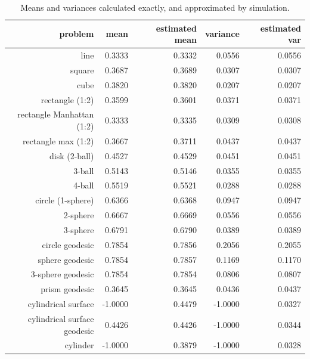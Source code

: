 \begin{table}[ht]
  \centering
  \begin{tabular}{r|rrrr}
                  problem &     mean & estimated mean & variance &  estimated var \\
     \hline 
                     line &   0.3333 &         0.3332 &   0.0556 &         0.0556 \\
                   square &   0.3687 &         0.3689 &   0.0307 &         0.0307 \\
                     cube &   0.3820 &         0.3820 &   0.0207 &         0.0207 \\
          rectangle (1:2) &   0.3599 &         0.3601 &   0.0371 &         0.0371 \\
rectangle Manhattan (1:2) &   0.3333 &         0.3335 &   0.0309 &         0.0308 \\
      rectangle max (1:2) &   0.3667 &         0.3711 &   0.0437 &         0.0437 \\
            disk (2-ball) &   0.4527 &         0.4529 &   0.0451 &         0.0451 \\
                   3-ball &   0.5143 &         0.5146 &   0.0355 &         0.0355 \\
                   4-ball &   0.5519 &         0.5521 &   0.0288 &         0.0288 \\
        circle (1-sphere) &   0.6366 &         0.6368 &   0.0947 &         0.0947 \\
                 2-sphere &   0.6667 &         0.6669 &   0.0556 &         0.0556 \\
                 3-sphere &   0.6791 &         0.6790 &   0.0389 &         0.0389 \\
          circle geodesic &   0.7854 &         0.7856 &   0.2056 &         0.2055 \\
          sphere geodesic &   0.7854 &         0.7857 &   0.1169 &         0.1170 \\
        3-sphere geodesic &   0.7854 &         0.7854 &   0.0806 &         0.0807 \\
           prism geodesic &   0.3645 &         0.3645 &   0.0436 &         0.0437 \\
      cylindrical surface &  -1.0000 &         0.4479 &  -1.0000 &         0.0327 \\
cylindrical surface geodesic &   0.4426 &         0.4426 &  -1.0000 &         0.0344 \\
                 cylinder &  -1.0000 &         0.3879 &  -1.0000 &         0.0328 \\
  \end{tabular}
  \caption{Means and variances calculated exactly, and approximated by simulation.}
  \label{tab:mean_var_estimates}
\end{table}






